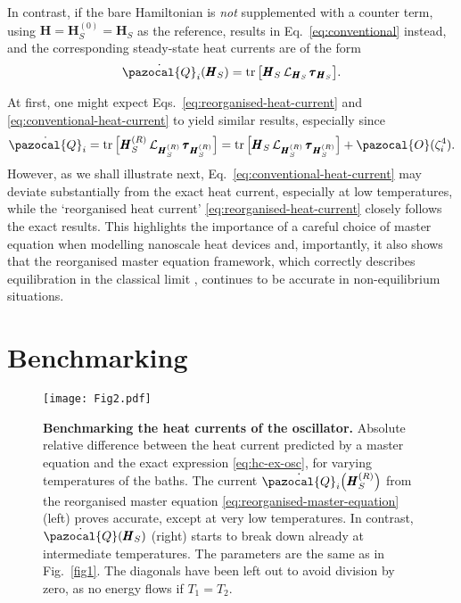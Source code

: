 \documentclass[aps,pra,superscriptaddress,twocolumn,nofootinbib]{revtex4-2}
\DeclareMathOperator{\tr}{tr}
\begin{document}
In contrast, if the bare Hamiltonian is \textit{not} supplemented with a counter term, using $ \pmb{H} = \pmb{H}_S^{(0)} = \pmb{H}_S $ as the reference, results in Eq.~\eqref{eq:conventional} instead, and the corresponding steady-state heat currents are of the form 
\begin{equation}\label{eq:conventional-heat-current}
    \dot{\pazocal{Q}}_i(\pmb{H}_S) = \tr{\left[ \pmb{H}_S\,\mathcal{L}_{\pmb{H}_S}\,\pmb{\tau}_{\pmb{H}_S} \right]}.
\end{equation}

At first, one might expect Eqs.~\eqref{eq:reorganised-heat-current} and \eqref{eq:conventional-heat-current} to yield similar results, especially since
\begin{equation*}
    \dot{\pazocal{Q}}_i = \tr{\big[ \pmb{H}_S^{(R)}\,\mathcal{L}_{\pmb{H}_S^{(R)}}\,\pmb{\tau}_{\pmb{H}_S^{(R)}}\big]} = \tr{\big[ \pmb{H}_S\,\mathcal{L}_{\pmb{H}_S^{(R)}}\,\pmb{\tau}_{\pmb{H}_S^{(R)}}\big]} + \pazocal{O}(\zeta_i^4).
\end{equation*}
However, as we shall illustrate next, Eq.~\eqref{eq:conventional-heat-current} may deviate substantially from the exact heat current, especially at low temperatures, while the `reorganised heat current' \eqref{eq:reorganised-heat-current} closely follows the exact results. This highlights the importance of a careful choice of master equation when modelling nanoscale heat devices and, importantly, it also shows that the reorganised master equation framework, which correctly describes equilibration in the classical limit \cite{winczewski2021,correa2023}, continues to be accurate in non-equilibrium situations.

\section{Benchmarking}\label{sec:examples}

\begin{figure*}[t]
\centering
\texttt{[image: Fig2.pdf]}
\caption{\textbf{Benchmarking the heat currents of the oscillator.} Absolute relative difference between the heat current predicted by a master equation and the exact expression \eqref{eq:hc-ex-osc}, for varying temperatures of the baths. The current $\dot{\pazocal{Q}}_i\big(\pmb{H}_S^{(R)}\big)$ from the reorganised master equation \eqref{eq:reorganised-master-equation} (left) proves accurate, except at very low temperatures. In contrast, $\dot{\pazocal{Q}}(\pmb{H}_S)$ (right) starts to break down already at intermediate temperatures. The parameters are the same as in Fig.~\ref{fig1}. The diagonals have been left out to avoid division by zero, as no energy flows if $ T_1 = T_2 $.}
\label{fig2}
\centering
\end{figure*}
\end{document}
